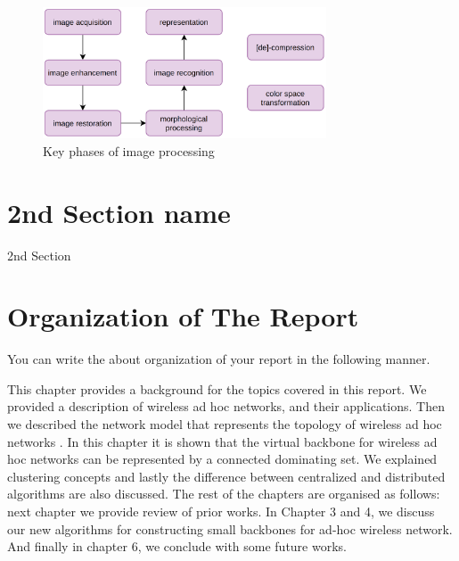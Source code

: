\begin{figure}[!ht]
    \centering
    \includegraphics[width=0.75\textwidth]{fig/1-2.png}
    \caption{Key phases of image processing}
    \label{fig:keyPhasesOfImageProcessing}
\end{figure}

\section{2nd Section name}

2nd Section

\section{Organization of The Report}

You can write the about organization of your report in the following manner.

This chapter provides a background for the topics covered in this
report. We provided a description of wireless ad hoc networks, and
their applications. Then we described the network model that
represents the topology of wireless ad hoc networks \cite{Omar2016}. In this
chapter it is shown that the virtual backbone for wireless ad hoc
networks can be represented by a connected dominating set. We
explained clustering concepts and lastly the difference between
centralized and distributed algorithms are also discussed. The
rest of the chapters are organised as follows: next chapter we
provide review of prior works. In Chapter 3 and 4, we discuss our
new algorithms for constructing small backbones for ad-hoc
wireless network. And finally in chapter 6, we conclude with some
future works.

